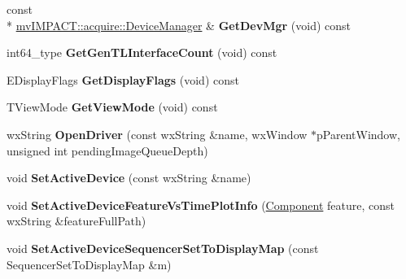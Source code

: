 \begin{DoxyCompactItemize}
\item 
\hypertarget{class_device_property_handler_a04f7f27d464b28763484ecfb93a4222c}{const \\*
\hyperlink{classmv_i_m_p_a_c_t_1_1acquire_1_1_device_manager}{mv\+I\+M\+P\+A\+C\+T\+::acquire\+::\+Device\+Manager} \& {\bfseries Get\+Dev\+Mgr} (void) const }\label{class_device_property_handler_a04f7f27d464b28763484ecfb93a4222c}

\item 
\hypertarget{class_device_property_handler_a7346859fcf2e8d07f7ed923a156e9e21}{int64\+\_\+type {\bfseries Get\+Gen\+T\+L\+Interface\+Count} (void) const }\label{class_device_property_handler_a7346859fcf2e8d07f7ed923a156e9e21}

\item 
\hypertarget{class_device_property_handler_adc06caed488a2ca0c9d479d34c0e5f56}{E\+Display\+Flags {\bfseries Get\+Display\+Flags} (void) const }\label{class_device_property_handler_adc06caed488a2ca0c9d479d34c0e5f56}

\item 
\hypertarget{class_device_property_handler_a0adfd5f7ece9889fc146caf8bc54694a}{T\+View\+Mode {\bfseries Get\+View\+Mode} (void) const }\label{class_device_property_handler_a0adfd5f7ece9889fc146caf8bc54694a}

\item 
\hypertarget{class_device_property_handler_a8a9636016e218542a2b46d5173c92aa1}{wx\+String {\bfseries Open\+Driver} (const wx\+String \&name, wx\+Window $\ast$p\+Parent\+Window, unsigned int pending\+Image\+Queue\+Depth)}\label{class_device_property_handler_a8a9636016e218542a2b46d5173c92aa1}

\item 
\hypertarget{class_device_property_handler_a04a133486753ea69abf1605ee8986545}{void {\bfseries Set\+Active\+Device} (const wx\+String \&name)}\label{class_device_property_handler_a04a133486753ea69abf1605ee8986545}

\item 
\hypertarget{class_device_property_handler_a868e1c3e40baffb21144c92dfb6c5b81}{void {\bfseries Set\+Active\+Device\+Feature\+Vs\+Time\+Plot\+Info} (\hyperlink{classmv_i_m_p_a_c_t_1_1acquire_1_1_component}{Component} feature, const wx\+String \&feature\+Full\+Path)}\label{class_device_property_handler_a868e1c3e40baffb21144c92dfb6c5b81}

\item 
\hypertarget{class_device_property_handler_a6d2e40d3e828c7e35914cd4077308e2d}{void {\bfseries Set\+Active\+Device\+Sequencer\+Set\+To\+Display\+Map} (const Sequencer\+Set\+To\+Display\+Map \&m)}\label{class_device_property_handler_a6d2e40d3e828c7e35914cd4077308e2d}


\end{DoxyCompactItemize}
